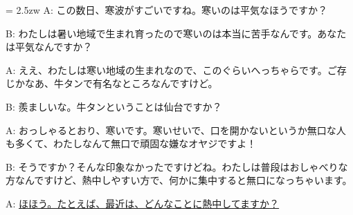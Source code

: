 \documentclass[11pt]{amsart}
\title{}
\author{}
\newenvironment{hangall}[1]{\hangindent = 2.5zw\everypar{\hangindent = 2.5zw}}{}
\begin{document}
\maketitle
\begin{hangall}{}%
A: この数日、寒波がすごいですね。寒いのは平気なほうですか？

B: わたしは暑い地域で生まれ育ったので寒いのは本当に苦手なんです。あなたは平気なんですか？

A: ええ、わたしは寒い地域の生まれなので、このぐらいへっちゃらです。ご存じかなあ、牛タンで有名なところなんですけど。

B: 羨ましいな。牛タンということは仙台ですか？

A: おっしゃるとおり、寒いです。寒いせいで、口を開かないというか無口な人も多くて、わたしなんて無口で頑固な嫌なオヤジですよ！

B: そうですか？そんな印象なかったですけどね。わたしは普段はおしゃべりな方なんですけど、熱中しやすい方で、何かに集中すると無口になっちゃいます。

A: \ul{ほほう。たとえば、最近は、どんなことに熱中してますか？}\end{hangall}
\end{document}
